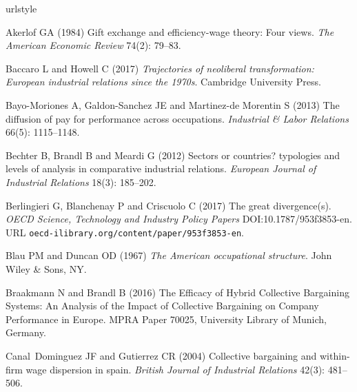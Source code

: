 \documentclass[Review,times,sageh,11pt]{sagej}
\begin{document}
\begin{thebibliography}{38}
\providecommand{\natexlab}[1]{#1}
\providecommand{\url}[1]{\texttt{#1}}
\providecommand{\urlprefix}{URL }
\expandafter\ifx\csname urlstyle\endcsname\relax
  \providecommand{\doi}[1]{DOI:\discretionary{}{}{}#1}\else
  \providecommand{\doi}{DOI:\discretionary{}{}{}\begingroup
  \urlstyle{rm}\Url}\fi

Akerlof GA (1984) Gift exchange and efficiency-wage theory: Four views.
\newblock \emph{The American Economic Review} 74(2): 79--83.

Baccaro L and Howell C (2017) \emph{Trajectories of neoliberal transformation:
  European industrial relations since the 1970s}.
\newblock Cambridge University Press.

Bayo-Moriones A, Galdon-Sanchez JE and Martinez-de Morentin S (2013) The
  diffusion of pay for performance across occupations.
\newblock \emph{Industrial \& Labor Relations} 66(5): 1115--1148.

Bechter B, Brandl B and Meardi G (2012) Sectors or countries? typologies and
  levels of analysis in comparative industrial relations.
\newblock \emph{European Journal of Industrial Relations} 18(3): 185--202.

Berlingieri G, Blanchenay P and Criscuolo C (2017) The great divergence(s).
\newblock \emph{OECD Science, Technology and Industry Policy Papers}
  \doi{10.1787/953f3853-en}.
\newblock
  \urlprefix\url{oecd-ilibrary.org/content/paper/953f3853-en}.

Blau PM and Duncan OD (1967) \emph{The American occupational structure}.
\newblock John Wiley \& Sons, NY.

Braakmann N and Brandl B (2016) {The Efficacy of Hybrid Collective Bargaining
  Systems: An Analysis of the Impact of Collective Bargaining on Company
  Performance in Europe}.
\newblock MPRA Paper 70025, University Library of Munich, Germany.

Canal~Dominguez JF and Gutierrez CR (2004) Collective bargaining and
  within-firm wage dispersion in spain.
\newblock \emph{British Journal of Industrial Relations} 42(3): 481--506.


\end{thebibliography}
\end{document}

